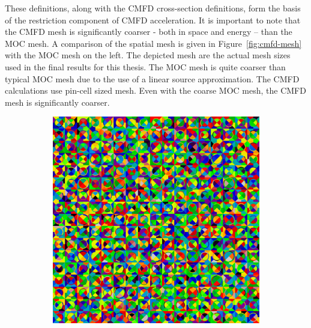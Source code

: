 These definitions, along with the \ac{CMFD} cross-section definitions, form the basis of the restriction component of \ac{CMFD} acceleration. It is important to note that the \ac{CMFD} mesh is significantly coarser - both in space and energy -- than the \ac{MOC} mesh. A comparison of the spatial mesh is given in Figure~\ref{fig:cmfd-mesh} with the \ac{MOC} mesh on the left. The depicted mesh are the actual mesh sizes used in the final results for this thesis. The \ac{MOC} mesh is quite coarser than typical \ac{MOC} mesh due to the use of a linear source approximation. The \ac{CMFD} calculations use pin-cell sized mesh. Even with the coarse \ac{MOC} mesh, the \ac{CMFD} mesh is significantly coarser.
\begin{figure}[h!]
	\centering
	\begin{subfigure}{0.45\textwidth}
		\centering
		\includegraphics[width=\linewidth]{figures/moc_mesh.PNG}
		\caption{}
		\label{fig:cmfd-mesh-a}
	\end{subfigure}
	\begin{subfigure}{0.45\textwidth}
		\centering

\end{subfigure}
\end{figure}
